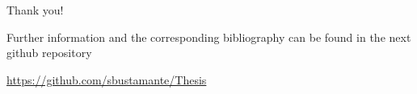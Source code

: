 \documentclass[8pt,fleqn]{beamer}
\begin{document}
\begin{frame}
\begin{tcolorbox}[colback=white!5,colframe=black!75!black,title=And finally]\justifying

	\begin{huge}
	\begin{center}
	Thank you!
	\end{center}
	\end{huge}

	\tcblower

	Further information and the corresponding bibliography can be found in 
	the next github repository

	\url{https://github.com/sbustamante/Thesis}

\end{tcolorbox}
\end{frame}
\end{document}
